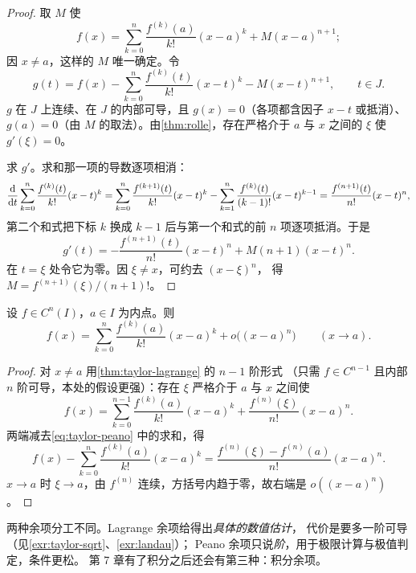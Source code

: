 \begin{proof}
  取 \(M\) 使
  \[
    f(x) = \sum_{k=0}^{n} \frac{f^{(k)}(a)}{k!}(x-a)^{k} + M(x-a)^{n+1} ;
  \]
  因 \(x \neq a\)，这样的 \(M\) 唯一确定。令
  \[
    g(t) = f(x) - \sum_{k=0}^{n} \frac{f^{(k)}(t)}{k!}(x-t)^{k} - M(x-t)^{n+1},
    \qquad t \in J .
  \]
  \(g\) 在 \(J\) 上连续、在 \(J\) 的内部可导，且 \(g(x)=0\)（各项都含因子 \(x-t\) 或抵消）、
  \(g(a)=0\)（由 \(M\) 的取法）。由\cref{thm:rolle}，存在严格介于 \(a\) 与 \(x\) 之间的
  \(\xi\) 使 \(g'(\xi)=0\)。

  求 \(g'\)。求和那一项的导数逐项相消：
  \[
    \frac{\mathop{}\!\mathrm{d}}{\mathop{}\!\mathrm{d} t}\sum_{k=0}^{n} \frac{f^{(k)}(t)}{k!}(x-t)^{k}
      = \sum_{k=0}^{n} \frac{f^{(k+1)}(t)}{k!}(x-t)^{k}
      - \sum_{k=1}^{n} \frac{f^{(k)}(t)}{(k-1)!}(x-t)^{k-1}
      = \frac{f^{(n+1)}(t)}{n!}(x-t)^{n} ,
  \]
  第二个和式把下标 \(k\) 换成 \(k-1\) 后与第一个和式的前 \(n\) 项逐项抵消。于是
  \[
    g'(t) = -\frac{f^{(n+1)}(t)}{n!}(x-t)^{n} + M(n+1)(x-t)^{n} .
  \]
  在 \(t=\xi\) 处令它为零。因 \(\xi \neq x\)，可约去 \((x-\xi)^{n}\)，
  得 \(M = f^{(n+1)}(\xi)/(n+1)!\)。
\end{proof}

\begin{theorem}
  \label{thm:taylor-peano}
  设 \(f \in C^{n}(I)\)，\(a \in I\) 为内点。则
  \begin{equation}
    \label{eq:taylor-peano}
    f(x) = \sum_{k=0}^{n} \frac{f^{(k)}(a)}{k!}(x-a)^{k} + o\bigl((x-a)^{n}\bigr)
    \qquad (x \to a) .
  \end{equation}
\end{theorem}

\begin{proof}
  对 \(x \neq a\) 用\cref{thm:taylor-lagrange} 的 \(n-1\) 阶形式
  （只需 \(f \in C^{n-1}\) 且内部 \(n\) 阶可导，本处的假设更强）：存在 \(\xi\)
  严格介于 \(a\) 与 \(x\) 之间使
  \[
    f(x) = \sum_{k=0}^{n-1} \frac{f^{(k)}(a)}{k!}(x-a)^{k}
         + \frac{f^{(n)}(\xi)}{n!}(x-a)^{n} .
  \]
  两端减去\cref{eq:taylor-peano} 中的求和，得
  \[
    f(x) - \sum_{k=0}^{n} \frac{f^{(k)}(a)}{k!}(x-a)^{k}
      = \frac{f^{(n)}(\xi) - f^{(n)}(a)}{n!}(x-a)^{n} .
  \]
  \(x \to a\) 时 \(\xi \to a\)，由 \(f^{(n)}\) 连续，方括号内趋于零，故右端是 \(o((x-a)^{n})\)。
\end{proof}

\begin{remark}
  两种余项分工不同。Lagrange 余项给得出\emph{具体的数值估计}，
  代价是要多一阶可导（见\cref{exr:taylor-sqrt}、\cref{exr:landau}）；
  Peano 余项只说\emph{阶}，用于极限计算与极值判定，条件更松。
  第 7 章有了积分之后还会有第三种：积分余项。
\end{remark}

